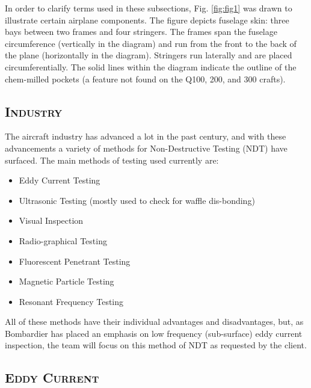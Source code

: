 \documentclass[12pt]{article}
\begin{document}
In order to clarify terms used in these subsections, Fig. \ref{fig:fig1} was drawn to illustrate certain airplane components. The figure depicts fuselage skin: three bays between two frames and four stringers. The frames span the fuselage circumference (vertically in the diagram) and run from the front to the back of the plane (horizontally in the diagram). Stringers run laterally and are placed circumferentially. The solid lines within the diagram indicate the outline of the chem-milled pockets (a feature not found on the Q100, 200, and 300 crafts).
 

\subsection{\textsc{Industry}} 

The aircraft industry has advanced a lot in the past century, and with these advancements a variety of methods for Non-Destructive Testing (NDT) have surfaced. The main methods of testing used currently are:

\begin{itemize}
\item Eddy Current Testing
\item Ultrasonic Testing (mostly used to check for waffle dis-bonding)
\item Visual Inspection
\item Radio-graphical Testing
\item Fluorescent Penetrant Testing
\item Magnetic Particle Testing
\item Resonant Frequency Testing
\end{itemize}

All of these methods have their individual advantages and disadvantages, but, as Bombardier has placed an emphasis on low frequency (sub-surface) eddy current inspection, the team will focus on this method of NDT as requested by the client.
 
\subsection{\textsc{Eddy Current}}
\end{document}
